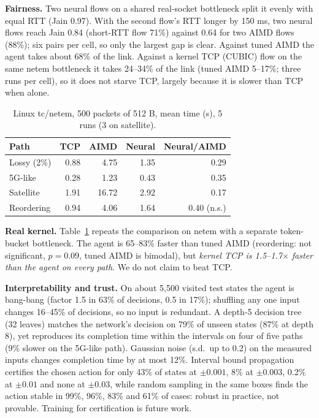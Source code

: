 \documentclass[10pt,twocolumn]{article}
\begin{document}
\textbf{Fairness.} Two neural flows on a shared real-socket bottleneck split it evenly with equal RTT (Jain 0.97). With the second flow's RTT longer by 150 ms, two neural flows reach Jain 0.84 (short-RTT flow 71\%) against 0.64 for two AIMD flows (88\%); six pairs per cell, so only the largest gap is clear. Against tuned AIMD the agent takes about 68\% of the link. Against a kernel TCP (CUBIC) flow on the same netem bottleneck it takes 24--34\% of the link (tuned AIMD 5--17\%; three runs per cell), so it does not starve TCP, largely because it is slower than TCP when alone.

\begin{table}[t]\centering\small
\caption{Linux tc/netem, 500 packets of 512 B, mean time (s), 5 runs (3 on satellite).}\label{t:net}
\begin{tabular}{@{}lrrrr@{}}\toprule
Path & TCP & AIMD & Neural & Neural/AIMD\\\midrule
Lossy (2\%) & 0.88 & 4.75 & 1.35 & 0.29\\
5G-like & 0.28 & 1.23 & 0.43 & 0.35\\
Satellite & 1.91 & 16.72 & 2.92 & 0.17\\
Reordering & 0.94 & 4.06 & 1.64 & 0.40 (n.s.)\\\bottomrule
\end{tabular}\end{table}

\textbf{Real kernel.} Table~\ref{t:net} repeats the comparison on netem with a separate token-bucket bottleneck. The agent is 65--83\% faster than tuned AIMD (reordering: not significant, $p=0.09$, tuned AIMD is bimodal), but \emph{kernel TCP is 1.5--1.7$\times$ faster than the agent on every path}. We do not claim to beat TCP.

\textbf{Interpretability and trust.} On about 5,500 visited test states the agent is bang-bang (factor 1.5 in 63\% of decisions, 0.5 in 17\%); shuffling any one input changes 16--45\% of decisions, so no input is redundant. A depth-5 decision tree (32 leaves) matches the network's decision on 79\% of unseen states (87\% at depth 8), yet reproduces its completion time within the intervals on four of five paths (9\% slower on the 5G-like path). Gaussian noise (s.d.\ up to 0.2) on the measured inputs changes completion time by at most 12\%. Interval bound propagation~\cite{c3} certifies the chosen action for only 43\% of states at $\pm0.001$, 8\% at $\pm0.003$, 0.2\% at $\pm0.01$ and none at $\pm0.03$, while random sampling in the same boxes finds the action stable in 99\%, 96\%, 83\% and 61\% of cases: robust in practice, not provable. Training for certification is future work.
\end{document}
